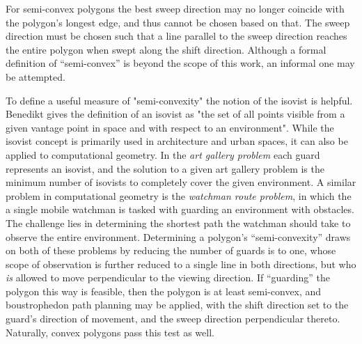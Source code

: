For semi-convex polygons the best sweep direction may no longer coincide with the polygon's longest edge, and thus cannot be chosen based on that.
The sweep direction must be chosen such that a line parallel to the sweep direction reaches the entire polygon when swept along the shift direction.
Although a formal definition of ``semi-convex'' is beyond the scope of this work, an informal one may be attempted.

To define a useful measure of "semi-convexity" the notion of the isovist is helpful.
Benedikt gives the definition of an isovist as "the set of all points visible from a given vantage point in space and with respect to an environment"\cite{Isovists}.
While the isovist concept is primarily used in architecture and urban spaces, it can also be applied to computational geometry.
In the \textit{art gallery problem} each guard represents an isovist, and the solution to a given art gallery problem is the minimum number of isovists to completely cover the given environment.
A similar problem in computational geometry is the \textit{watchman route problem}, in which the a single mobile watchman is tasked with guarding an environment with obstacles.
The challenge lies in determining the shortest path the watchman should take to observe the entire environment.
Determining a polygon's ``semi-convexity'' draws on both of these problems by reducing the number of guards is to one, whose scope of observation is further reduced to a single line in both directions, but who \textit{is} allowed to move perpendicular to the viewing direction.
If ``guarding'' the polygon this way is feasible, then the polygon is at least semi-convex, and boustrophedon path planning may be applied, with the shift direction set to the guard's direction of movement, and the sweep direction perpendicular thereto.
Naturally, convex polygons pass this test as well.

